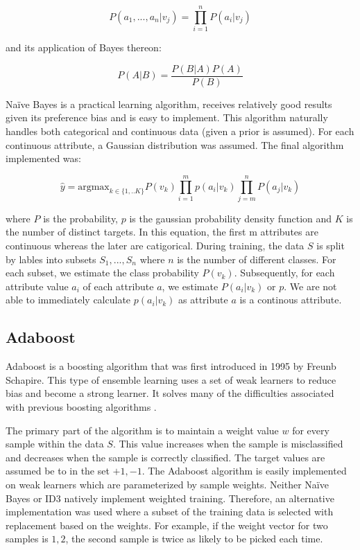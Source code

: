 \documentclass[11pt]{article}
\begin{document}
$$P(a_1,...,a_n|v_j) = \prod_{i=1}^{n}P(a_i|v_j)$$

and its application of Bayes thereon:

$$P(A|B) = \frac{P(B|A)P(A)}{P(B)}$$

Naïve Bayes is a practical learning algorithm, receives relatively good results given its preference bias and is easy to implement. This algorithm naturally handles both categorical and continuous data (given a prior is assumed). For each continuous attribute, a Gaussian distribution was assumed. The final algorithm implemented was:

$$\hat{y}= \mathrm{argmax}_{k\in\{1,..K\}} P(v_k)\prod_{i=1}^mp\left(a_i|v_k\right)\prod_{j=m}^nP\left(a_j|v_k\right)$$

where $P$ is the probability, $p$ is the gaussian probability density function and $K$ is the number of distinct targets. In this equation, the first m attributes are continuous whereas the later are catigorical. During training, the data $S$ is split by lables into subsets ${S_1,...,S_n}$ where $n$ is the number of different classes. For each subset, we estimate the class probability $P(v_k)$. Subsequently, for each attribute value $a_i$ of each attribute $a$, we estimate $P(a_i|v_k)$ or $p$. We are not able to immediately calculate $p(a_i|v_k)$ as attribute $a$ is a continous attribute.

\subsection{Adaboost} \label{adaboost}
Adaboost is a boosting algorithm that was first introduced in 1995 by Freunb Schapire. This type of ensemble learning uses a set of weak learners to reduce bias and become a strong learner. It solves many of the difficulties associated with previous boosting algorithms \cite{Schapire:1999:BIB:1624312.1624417}.

The primary part of the algorithm is to maintain a weight value $w$ for every sample within the data $S$. This value increases when the sample is misclassified and decreases when the sample is correctly classified. The target values are assumed be to in the set ${+1, -1}$. The Adaboost algorithm is easily implemented on weak learners which are parameterized by sample weights. Neither Naïve Bayes or ID3 natively implement weighted training. Therefore, an alternative implementation was used where a subset of the training data is selected with replacement based on the weights. For example, if the weight vector for two samples is ${1, 2}$, the second sample is twice as likely to be picked each time.
\end{document}
